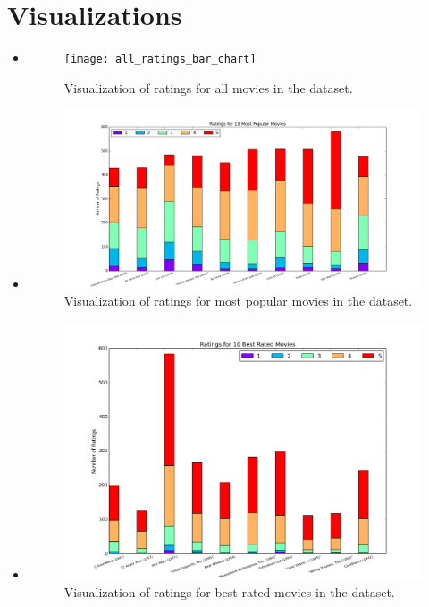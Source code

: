 \section{Visualizations}
\medskip
\begin{itemize}

    \item {}

    \begin{figure}[H]
    \centering
    \texttt{[image: all\_ratings\_bar\_chart]}
    \caption{Visualization of ratings for all movies in the dataset.}
    \end{figure}


    \pagebreak
    \item {}

    \begin{figure}[H]
    \centering
    \includegraphics[width=\textwidth]{most-popular}
    \caption{Visualization of ratings for most popular movies in the dataset.}
    \end{figure}

    \pagebreak
    \item {}

    \begin{figure}[H]
    \centering
    \includegraphics[width=\textwidth]{best-rated}
    \caption{Visualization of ratings for best rated movies in the dataset.}
    \end{figure}


\end{itemize}
